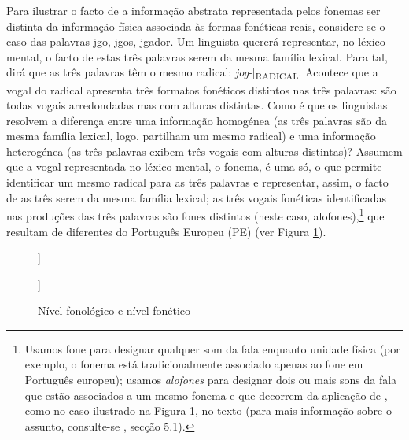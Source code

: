 \documentclass[output=paper]{LSP/langsci}
\begin{document}
Para ilustrar o facto de a informação abstrata representada pelos fonemas ser distinta da informação física associada às formas fonéticas reais, considere-se o caso das palavras j\textipa{[o]}go, j\textipa{[O]}gos, j\textipa{[u]}gador. Um linguista quererá representar, no léxico mental, o facto de estas três palavras serem da mesma família lexical. Para tal, dirá que as três palavras têm o mesmo radical: \textit{jog}-]\textsubscript{RADICAL}. Acontece que a vogal do radical apresenta três formatos fonéticos distintos nas três palavras: \textipa{[o, O, u]} são todas vogais arredondadas mas com alturas distintas. Como é que os linguistas resolvem a diferença entre uma informação homogénea (as três palavras são da mesma família lexical, logo, partilham um mesmo radical) e uma informação heterogénea (as três palavras exibem três vogais com alturas distintas)? Assumem que a vogal representada no léxico mental, o fonema, é uma só, o que permite identificar um mesmo radical para as três palavras e representar, assim, o facto de as três serem da mesma família lexical; as três vogais fonéticas identificadas nas produções das três palavras são fones distintos (neste caso, alofones),\footnote{Usamos fone para designar qualquer som da fala enquanto unidade física (por exemplo, o fonema \textipa{/\textltailn/} está tradicionalmente associado apenas ao fone \textipa{[\textltailn]} em Português europeu); usamos \textit{alofones} para designar dois ou mais sons da fala que estão associados a um mesmo fonema e que decorrem da aplicação de , como no caso ilustrado na Figura \ref{fig:lousada_2}, no texto (para mais informação sobre o assunto, consulte-se \citealt{mateus_etal2005}, secção 5.1).} que resultam de diferentes  do Português Europeu (PE) (ver Figura \ref{fig:lousada_2}).

\begin{figure}
\begin{forest}
	[~~~~~~~~~~~~~\textipa{/ZOg-/}\textsubscript{RADICAL}
		[\textipa{[ZOg-]}\textit{os}]
		[\textipa{[Zog-]}\textit{o}]
		[\textipa{[Zug-]}\textit{ador}]
		]	
\end{forest}
\quad
\begin{forest}
	[nível fonológico -- representação mental, no edge [nível fonético -- realidade física, no edge]]
\end{forest}
\caption{Nível fonológico e nível fonético}
\label{fig:lousada_2}
\end{figure}
\end{document}
